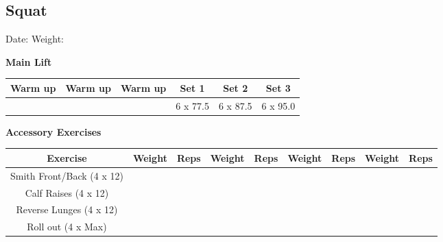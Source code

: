 \documentclass{article}%
\begin{document}
\subsection*{Squat}%
Date: %
\linebreak%
Weight: %
\vspace*{20pt}%
\linebreak%
\begin{minipage}{0.5\textwidth}%
\textbf{Main Lift\newline%
\newline%
}%
\begin{tabular}{|c|c|c|c|c|c|}%
\hline%
Warm up&Warm up&Warm up&Set 1&Set 2&Set 3\\%
\hline%
&&&6 x 77.5&6 x 87.5&6 x 95.0\\%
\hline%
\end{tabular}%
\vspace*{20pt}%
\linebreak%
\textbf{Accessory Exercises\newline%
\newline%
}%
\begin{tabular}{|c|c|c|c|c|c|c|c|c|}%
\hline%
Exercise&Weight&Reps&Weight&Reps&Weight&Reps&Weight&Reps\\%
\hline%
Smith Front/Back (4 x 12)&&&&&&&&\\%
\hline%
Calf Raises (4 x 12)&&&&&&&&\\%
\hline%
Reverse Lunges (4 x 12)&&&&&&&&\\%
\hline%
Roll out (4 x Max)&&&&&&&&\\%
\hline%
\end{tabular}%
\end{minipage}%
\vspace*{20pt}%
\linebreak

%
\end{document}
